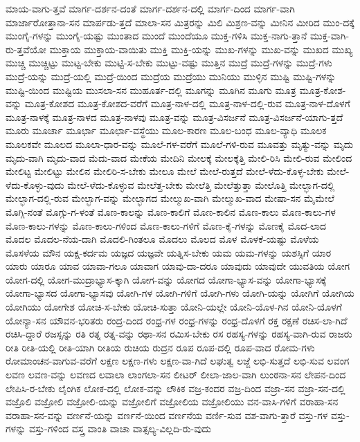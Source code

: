 {ಮಾಯ-ವಾಗು-ತ್ತವೆ
ಮಾರ್ಗ-ದರ್ಶನ-ದಂತೆ
ಮಾರ್ಗ-ದರ್ಶನ-ದಲ್ಲಿ
ಮಾರ್ಗ-ದಿಂದ
ಮಾರ್ಗ-ವಾಗಿ
ಮಾರ್ಜಾರೋತ್ತಾನಾ-ಸನ
ಮಾರ್ಪಡು-ತ್ತದೆ
ಮಾಲಾ-ಸನ
ಮಿತ್ರರನ್ನು
ಮಿಲಿ
ಮಿಶ್ರಣ-ವನ್ನು
ಮೀನಿನ
ಮೀರಿದ
ಮುಂ-ದಕ್ಕೆ
ಮುಂಗೈ-ಗಳನ್ನು
ಮುಂಗೈ-ಯಷ್ಟು
ಮುಂತಾದ
ಮುಂದೆ
ಮುಂದೆಯೂ
ಮುಕ್ತ-ಗಳಿಸಿ
ಮುಕ್ತ-ನಾಗು-ತ್ತಾನೆ
ಮುಕ್ತ-ವಾಗಿ-ರು-ತ್ತವೆಯೋ
ಮುಕ್ತಾಯ
ಮುಕ್ತಾಯ-ವಾಯಿತು
ಮುಕ್ತಿ
ಮುಕ್ತಿ-ಯನ್ನು
ಮುಖ-ಗಳನ್ನು
ಮುಖ-ವನ್ನು
ಮುಖದ
ಮುಖ್ಯ
ಮುಚ್ಚಿ
ಮುಚ್ಚಿಟ್ಟು
ಮುಟ್ಟ-ಬೇಕು
ಮುಟ್ಟಿ-ಸ-ಬೇಕು
ಮುಟ್ಟು-ವಷ್ಟು
ಮುತ್ತಿನ
ಮುದ್ರೆ
ಮುದ್ರೆ-ಗಳನ್ನು
ಮುದ್ರೆ-ಗಳು
ಮುದ್ರೆ-ಯನ್ನು
ಮುದ್ರೆ-ಯಲ್ಲಿ
ಮುದ್ರೆ-ಯಿಂದ
ಮುದ್ರೆಯ
ಮುದ್ರೆಯು
ಮುನಿಯು
ಮುಳ್ಳಿನ
ಮುಷ್ಟಿ
ಮುಷ್ಟಿ-ಗಳನ್ನು
ಮುಷ್ಟಿ-ಯಿಂದ
ಮುಷ್ಟಿಯ
ಮುಸಲಾ-ಸನ
ಮುಹೂರ್ತ-ದಲ್ಲಿ
ಮೂಗನ್ನು
ಮೂಗಿನ
ಮೂಗು
ಮೂತ್ರ
ಮೂತ್ರ-ಕೋಶ-ವನ್ನು
ಮೂತ್ರ-ಕೋಶದ
ಮೂತ್ರ-ಕೋಶದ-ವರೆಗೆ
ಮೂತ್ರ-ನಾಳ-ದಲ್ಲಿ
ಮೂತ್ರ-ನಾಳ-ದಲ್ಲಿ-ರುವ
ಮೂತ್ರ-ನಾಳ-ದೊಳಗೆ
ಮೂತ್ರ-ನಾಳಕ್ಕೆ
ಮೂತ್ರ-ನಾಳದ
ಮೂತ್ರ-ನಾಳವು
ಮೂತ್ರ-ವನ್ನು
ಮೂತ್ರ-ವಿಸರ್ಜನೆ
ಮೂತ್ರ-ವಿಸರ್ಜನೆ-ಯಾಗು-ತ್ತದೆ
ಮೂರು
ಮೂರ್ಚಾ
ಮೂರ್ಛಾ
ಮೂರ್ಛಾ-ವಸ್ಥೆಯು
ಮೂಲ-ಕಾರಣ
ಮೂಲ-ಬಂಧ
ಮೂಲ-ವ್ಯಾಧಿ
ಮೂಲಕ
ಮೂಲಕವೇ
ಮೂಲದ
ಮೂಲಾ-ಧಾರ-ವನ್ನು
ಮೂಲೆ-ಗಳ-ವರೆಗೆ
ಮೂಲೆ-ಗಳಿ-ರುವ
ಮೂವತ್ತು
ಮೃತ್ಯು-ವನ್ನು
ಮೃದು
ಮೃದು-ವಾಗಿ
ಮೃದು-ವಾದ
ಮೆದು-ವಾದ
ಮೇಕೆಯ
ಮೇದಿನಿ
ಮೇಲಕ್ಕೆ
ಮೇಲಕ್ಕೆತ್ತಿ
ಮೇಲಿ-ರಿಸಿ
ಮೇಲಿ-ರುವ
ಮೇಲಿಂದ
ಮೇಲಿಟ್ಟ
ಮೇಲಿಟ್ಟು
ಮೇಲಿನ
ಮೇಲಿರಿ-ಸ-ಬೇಕು
ಮೇಲೂ
ಮೇಲೆ
ಮೇಲೆ-ರುತ್ತದೆ
ಮೇಲೆ-ಳೆದು-ಕೊಳ್ಳ-ಬೇಕು
ಮೇಲೆ-ಳೆದು-ಕೊಳ್ಳು-ವುದು
ಮೇಲೆ-ಳೆದು-ಕೊಳ್ಳುವ
ಮೇಲೆತ್ತ-ಬೇಕು
ಮೇಲೆತ್ತಿ
ಮೇಲೆತ್ತುತ್ತಾ
ಮೇಲೊತ್ತಿ
ಮೇಲ್ಭಾಗ-ದಲ್ಲಿ
ಮೇಲ್ಭಾಗ-ದಲ್ಲಿ-ರುವ
ಮೇಲ್ಭಾಗ-ವನ್ನು
ಮೇಲ್ಭಾಗದ
ಮೇಲ್ಮುಖ-ವಾಗಿ
ಮೇಲ್ಮುಖ-ವಾದ
ಮೇಷಾ-ಸನ
ಮೈಮೇಲೆ
ಮೊಗ್ಗಿ-ನಂತೆ
ಮೊಗ್ಗು-ಗ-ಳಂತೆ
ಮೊಣ-ಕಾಲನ್ನು
ಮೊಣ-ಕಾಲಿಗೆ
ಮೊಣ-ಕಾಲಿನ
ಮೊಣ-ಕಾಲು
ಮೊಣ-ಕಾಲು-ಗಳ
ಮೊಣ-ಕಾಲು-ಗಳನ್ನು
ಮೊಣ-ಕಾಲು-ಗಳಿಂದ
ಮೊಣ-ಕಾಲು-ಗಳಿಗೆ
ಮೊಣ-ಕೈ-ಗಳನ್ನು
ಮೊಣಕೈ
ಮೊದ-ಲಾದ
ಮೊದಲ
ಮೊದಲ-ನೆಯ-ದಾಗಿ
ಮೊದಲಿ-ಗಿಂತಲೂ
ಮೊದಲು
ಮೊಲದ
ಮೊಳ
ಮೊಳಕೆ-ಯಷ್ಟು
ಮೊಳೆಯ
ಮೊಸಳೆಯ
ಮೌನ
ಯಕ್ಷ-ಕರ್ದಮ
ಯಜ್ಞದ
ಯಜ್ಞವೇ
ಯತ್ನಿಸ-ಬೇಕು
ಯಮ
ಯಮ-ಗಳನ್ನು
ಯಶಸ್ಸಿಗೆ
ಯಾರ
ಯಾರು
ಯಾರೂ
ಯಾವ
ಯಾವಾ-ಗಲೂ
ಯಾವಾಗ
ಯಾವು-ದಾ-ದರೂ
ಯಾವುದು
ಯಾವುದೇ
ಯುವತಿಯ
ಯೋಗ
ಯೋಗ-ದಲ್ಲಿ
ಯೋಗ-ಮುದ್ರಾಭ್ಯಾಸ-ಕ್ಕಾಗಿ
ಯೋಗ-ವನ್ನು
ಯೋಗದ
ಯೋಗಾ-ಭ್ಯಾಸ-ವನ್ನು
ಯೋಗಾ-ಭ್ಯಾಸಕ್ಕೆ
ಯೋಗಾ-ಭ್ಯಾಸದ
ಯೋಗಾ-ಭ್ಯಾಸವು
ಯೋಗಿ-ಗಳ
ಯೋಗಿ-ಗಳಿಗೆ
ಯೋಗಿ-ಗಳು
ಯೋಗಿ-ಯನ್ನು
ಯೋಗಿಗೆ
ಯೋಗಿಯ
ಯೋಗಿಯು
ಯೋಗೇಶ
ಯೋಚಿ-ಸ-ಬೇಕು
ಯೋಚಿ-ಸುತ್ತಾ
ಯೋನಿ-ಯಲ್ಲೇ
ಯೋನಿ-ಯೊಳ-ಗಿನ
ಯೋನಿ-ಯೊಳಗೆ
ಯೋನ್ಯಾ-ಸನ
ಯೌವನ-ಭರಿತರು
ರಂದ್ರ-ದಿಂದ
ರಂಧ್ರ-ಗಳ
ರಂಧ್ರ-ಗಳನ್ನು
ರಂಧ್ರ-ದೊಳಗೆ
ರಕ್ತ
ರಕ್ಷಣೆ
ರಚಿಸ-ಲಾ-ಗಿದೆ
ರಚಿಸಿ-ದ್ದಾರೆ
ರಜಸ್ಸನ್ನು
ರತಿ
ರತ್ನ
ರತ್ನ-ವನ್ನು
ರಥಾ-ಸನ
ರಮಿಸ-ಬೇಕು
ರಸ
ರಹಸ್ಯ-ಗಳನ್ನು
ರಹಸ್ಯ-ವಾಗಿ-ರುವ
ರಾಜರು
ರೀತಿ
ರೀತಿ-ಯಲ್ಲಿ
ರೀತಿ-ಯಾಗಿ
ರೀತಿಯ
ರುಚಿಯ
ರುದ್ರನ
ರೂಪ
ರೂಪ-ದಲ್ಲಿ
ರೂಪ-ವಾದ
ರೋಮ-ಗಳು
ರೋಮಾಂಚನ-ವಾಗುವ-ವರೆಗೆ
ಲಕ್ಷಣ
ಲಕ್ಷಣ-ಗಳು
ಲಕ್ಷಣ-ವಾ-ಗಿದೆ
ಲಘುತ್ವ
ಲಜ್ಜೆ
ಲಭಿ-ಸುತ್ತದೆ
ಲಭಿ-ಸುವ
ಲವಂಗ
ಲವಣ
ಲವಣ-ವನ್ನು
ಲವಣದ
ಲವಾಲಾ
ಲಾಂಗಲಾ-ಸನ
ಲೀಟರ್
ಲೀಲಾ-ಜಾಲ-ವಾಗಿ
ಲುಂಠನಾ-ಸನ
ಲೇಪನ-ದಿಂದ
ಲೇಪಿಸಿ-ರ-ಬೇಕು
ಲೈಂಗಿಕ
ಲೋಕ-ದಲ್ಲಿ
ಲೋಕ-ವನ್ನು
ಲೌಕಿಕ
ವಜ್ರ-ಕಂದರ
ವಜ್ರ-ದಿಂದ
ವಜ್ರಾ-ಸನ
ವಜ್ರಾ-ಸನ-ದಲ್ಲಿ
ವಜ್ರೊಲಿ
ವಜ್ರೋಲಿ
ವಜ್ರೋಲಿ-ಯನ್ನು
ವಜ್ರೋಲಿಗೆ
ವಜ್ರೋಲಿಯ
ವಜ್ರೋಲಿಯು
ವನ-ವಾಸಿ-ಗಳಿಗೆ
ವರಾಹಾ-ಸನ
ವರಾಹಾ-ಸನ-ವನ್ನು
ವರ್ಣನೆ-ಯನ್ನು
ವರ್ಣನೆ-ಯಿಂದ
ವರ್ಣನೆಯ
ವರ್ಣಿ-ಸುವ
ವಶ-ವಾಗು-ತ್ತಾರೆ
ವಸ್ತು-ಗಳ
ವಸ್ತು-ಗಳನ್ನು
ವಸ್ತು-ಗಳಿಂದ
ವಸ್ತ್ರ
ವಾಂತಿ
ವಾಚಾ
ವಾತ್ಸಲ್ಯ-ವಿಲ್ಲದಿ-ರು-ವುದು
}
